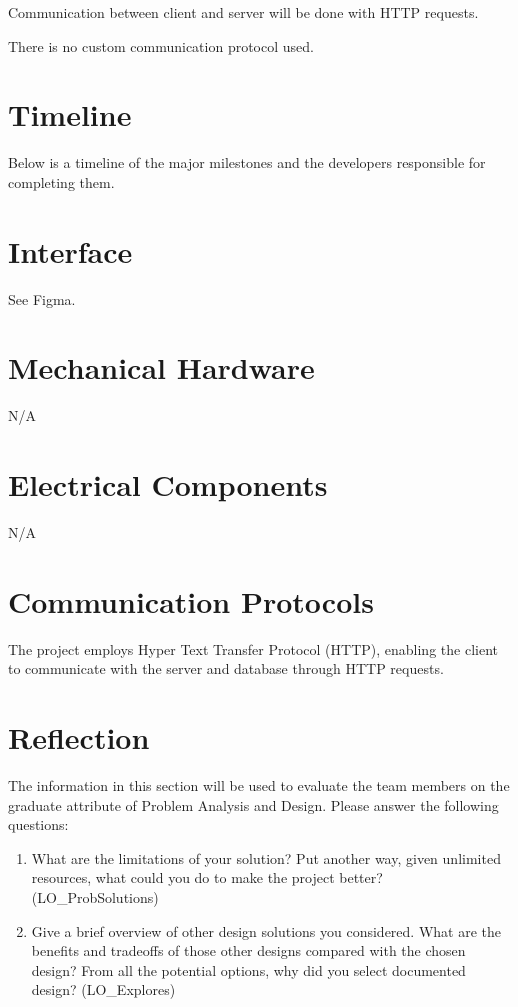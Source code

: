 \documentclass[12pt, titlepage]{article}
\begin{document}
	
	Communication between client and server will be done with HTTP requests.

	There is no custom communication protocol used.
	
	\section{Timeline}
	
	Below is a timeline of the major milestones and the developers responsible for completing them.
	
	
	\newpage{}
	
	\appendix
	
	\section{Interface}
	
	
	See Figma.
	
	\section{Mechanical Hardware}
	N/A
	
	\section{Electrical Components}
	N/A
	
	\section{Communication Protocols}
	The project employs Hyper Text Transfer Protocol (HTTP), enabling the client to communicate with the server and database through HTTP requests.
	
	\section{Reflection}
	
	The information in this section will be used to evaluate the team members on the
	graduate attribute of Problem Analysis and Design.  Please answer the following questions:
	
	\begin{enumerate}
		\item What are the limitations of your solution?  Put another way, given
		unlimited resources, what could you do to make the project better? (LO\_ProbSolutions)
		\item Give a brief overview of other design solutions you considered.  What
		are the benefits and tradeoffs of those other designs compared with the chosen
		design?  From all the potential options, why did you select documented design?
		(LO\_Explores)
	\end{enumerate}
	
\end{document}
